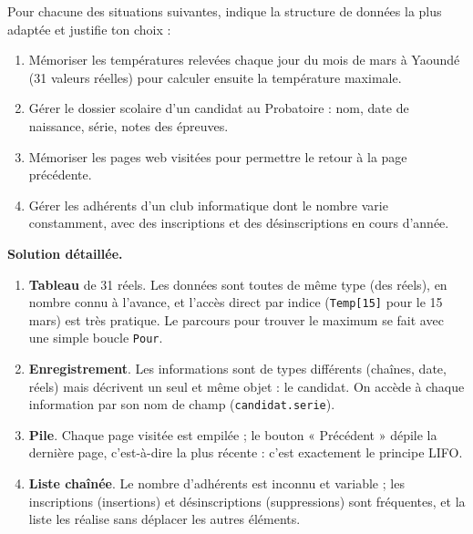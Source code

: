 \documentclass[11pt]{article}
\begin{document}
\begin{exoresolu}
Pour chacune des situations suivantes, indique la structure de données la plus adaptée et justifie ton choix :
\begin{enumerate}
  \item Mémoriser les températures relevées chaque jour du mois de mars à Yaoundé (31 valeurs réelles) pour calculer ensuite la température maximale.
  \item Gérer le dossier scolaire d'un candidat au Probatoire : nom, date de naissance, série, notes des épreuves.
  \item Mémoriser les pages web visitées pour permettre le retour à la page précédente.
  \item Gérer les adhérents d'un club informatique dont le nombre varie constamment, avec des inscriptions et des désinscriptions en cours d'année.
\end{enumerate}
\tcblower
\textbf{Solution détaillée.}
\begin{enumerate}
  \item \textbf{Tableau} de 31 réels. Les données sont toutes de même type (des réels), en nombre connu à l'avance, et l'accès direct par indice (\texttt{Temp[15]} pour le 15 mars) est très pratique. Le parcours pour trouver le maximum se fait avec une simple boucle \texttt{Pour}.
  \item \textbf{Enregistrement}. Les informations sont de types différents (chaînes, date, réels) mais décrivent un seul et même objet : le candidat. On accède à chaque information par son nom de champ (\texttt{candidat.serie}).
  \item \textbf{Pile}. Chaque page visitée est empilée ; le bouton « Précédent » dépile la dernière page, c'est-à-dire la plus récente : c'est exactement le principe LIFO.
  \item \textbf{Liste chaînée}. Le nombre d'adhérents est inconnu et variable ; les inscriptions (insertions) et désinscriptions (suppressions) sont fréquentes, et la liste les réalise sans déplacer les autres éléments.
\end{enumerate}
\end{exoresolu}
\end{document}
